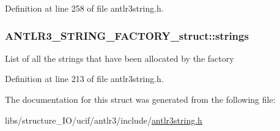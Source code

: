 Definition at line 258 of file antlr3string.\-h.

\hypertarget{struct_a_n_t_l_r3___s_t_r_i_n_g___f_a_c_t_o_r_y__struct_adac80c0382761ae27e966c76b10cedd4}{
\subsubsection[{strings}]{ A\-N\-T\-L\-R3\-\_\-\-S\-T\-R\-I\-N\-G\-\_\-\-F\-A\-C\-T\-O\-R\-Y\-\_\-struct\-::strings}}\label{struct_a_n_t_l_r3___s_t_r_i_n_g___f_a_c_t_o_r_y__struct_adac80c0382761ae27e966c76b10cedd4}
List of all the strings that have been allocated by the factory 

Definition at line 213 of file antlr3string.\-h.



The documentation for this struct was generated from the following file\-:\begin{DoxyCompactItemize}
\item 
libs/structure\-\_\-\-I\-O/ucif/antlr3/include/\hyperlink{antlr3string_8h}{antlr3string.\-h}\end{DoxyCompactItemize}
